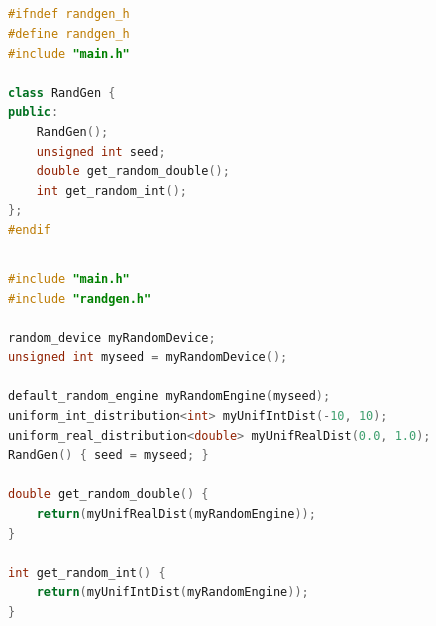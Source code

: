 \documentclass[10pt, letterpaper]{report}
\begin{document}
\newpage 
\subsection{}
\begin{lstlisting}[style=CppStyle,language=C++]
#ifndef randgen_h
#define randgen_h
#include "main.h"

class RandGen {
public:
    RandGen();
    unsigned int seed;
    double get_random_double();
    int get_random_int(); 
};
#endif
\end{lstlisting} 
\subsection{}
\begin{lstlisting}[style=CppStyle,language=C++]
#include "main.h"
#include "randgen.h"

random_device myRandomDevice;
unsigned int myseed = myRandomDevice();

default_random_engine myRandomEngine(myseed);
uniform_int_distribution<int> myUnifIntDist(-10, 10);
uniform_real_distribution<double> myUnifRealDist(0.0, 1.0);
RandGen() { seed = myseed; }

double get_random_double() {
    return(myUnifRealDist(myRandomEngine));
} 

int get_random_int() {
    return(myUnifIntDist(myRandomEngine)); 
} 
\end{lstlisting} 
\end{document}
